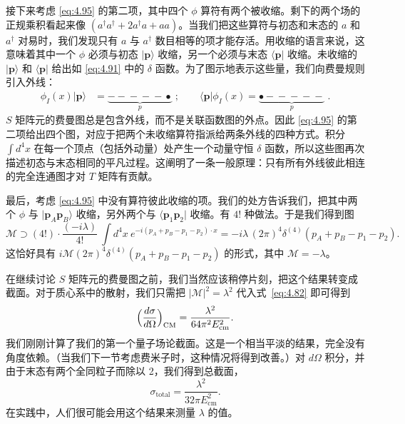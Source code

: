 接下来考虑 \eqref{eq:4.95} 的第二项，其中四个 $\phi$ 算符有两个被收缩。剩下的两个场的正规乘积看起来像 $(a^\dagger a^\dagger + 2a^\dagger a + aa)$。当我们把这些算符与初态和末态的 $a$ 和 $a^\dagger$ 对易时，我们发现只有 $a$ 与 $a^\dagger$ 数目相等的项才能存活。用收缩的语言来说，这意味着其中一个 $\phi$ 必须与初态 $|\mathbf{p}\rangle$ 收缩，另一个必须与末态 $\langle\mathbf{p}|$ 收缩。未收缩的 $|\mathbf{p}\rangle$ 和 $\langle\mathbf{p}|$ 给出如 \eqref{eq:4.91} 中的 $\delta$ 函数。为了图示地表示这些量，我们向费曼规则引入外线：
\begin{equation}
  \begin{aligned}
    \phi_I(x)|\mathbf{p}\rangle &=
      \underbrace{-\!-\!-\!-\!-\!\bullet}_{p}\; ;
    \qquad
    \langle\mathbf{p}|\phi_I(x) =
      \underbrace{\bullet\!-\!-\!-\!-\!-\!}_{p}\; .
  \end{aligned}
  \label{eq:4.97}
\end{equation}
$S$ 矩阵元的费曼图总是包含外线，而不是关联函数图的外点。因此 \eqref{eq:4.95} 的第二项给出四个图，对应于把两个未收缩算符指派给两条外线的四种方式。积分 $\int d^4x$ 在每一个顶点（包括外动量）处产生一个动量守恒 $\delta$ 函数，所以这些图再次描述初态与末态相同的平凡过程。这阐明了一条一般原理：只有所有外线彼此相连的完全连通图才对 $T$ 矩阵有贡献。

最后，考虑 \eqref{eq:4.95} 中没有算符彼此收缩的项。我们的处方告诉我们，把其中两个 $\phi$ 与 $|\mathbf{p}_A\mathbf{p}_B\rangle$ 收缩，另外两个与 $\langle \mathbf{p}_1\mathbf{p}_2|$ 收缩。有 $4!$ 种做法。于是我们得到图
\begin{equation}
  \mathcal{M} \supset (4!)\cdot \frac{(-i\lambda)}{4!}\
    \int d^4x\ e^{-i(p_A+p_B-p_1-p_2)\cdot x}
  = -i\lambda\,(2\pi)^4\delta^{(4)}(p_A+p_B-p_1-p_2) .
  \label{eq:4.98}
\end{equation}
这恰好具有 $i\mathcal{M}(2\pi)^4\delta^{(4)}(p_A+p_B-p_1-p_2)$ 的形式，其中 $\mathcal{M} = -\lambda$。

在继续讨论 $S$ 矩阵元的费曼图之前，我们当然应该稍停片刻，把这个结果转变成截面。对于质心系中的散射，我们只需把 $|\mathcal{M}|^2 = \lambda^2$ 代入式~\eqref{eq:4.82} 即可得到
\begin{equation}
  \Bigl( \frac{d\sigma}{d\Omega} \Bigr)_{\mathrm{CM}}
    = \frac{\lambda^2}{64\pi^2E_{\mathrm{cm}}^2} .
  \label{eq:4.99}
\end{equation}
我们刚刚计算了我们的第一个量子场论截面。这是一个相当平淡的结果，完全没有角度依赖。（当我们下一节考虑费米子时，这种情况将得到改善。）对 $d\Omega$ 积分，并由于末态有两个全同粒子而除以 2，我们得到总截面，
\begin{equation}
  \sigma_{\mathrm{total}} = \frac{\lambda^2}{32\pi E_{\mathrm{cm}}^2} .
  \label{eq:4.100}
\end{equation}
在实践中，人们很可能会用这个结果来测量 $\lambda$ 的值。

